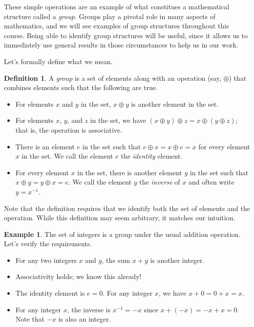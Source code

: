 \documentclass{book}
\theoremstyle{plain}
\theoremstyle{definition}
\newtheorem{definition}[theorem]{Definition}
\newtheorem{example}[theorem]{Example}
\begin{document}
These simple operations are an example of what constitues a mathematical structure called a {\it group}. Groups play a pivotal role in many aspects of mathematics, and we will see examples of group structures throughout this course. Being able to identify group structures will be useful, since it allows us to immediately use general results in those circumstances to help us in our work.

Let's formally define what we mean.

\begin{definition}
A {\it group} is a set of elements along with an operation (say, $\oplus$) that combines elements such that the following are true.
\begin{itemize}
\item For elements $x$ and $y$ in the set, $x \oplus y$ is another element in the set.
\item For elements $x$, $y$, and $z$ in the set, we have $(x \oplus y) \oplus z = x \oplus (y \oplus z)$; that is, the operation is associative.
\item There is an element $e$ in the set such that $e \oplus x = x \oplus e = x$ for every element $x$ in the set. We call the element $e$ the {\it identity} element.
\item For every element $x$ in the set, there is another element $y$ in the set such that $x \oplus y = y \oplus x = e$. We call the element $y$ the {\it inverse} of $x$ and often write $y = x^{-1}$.
\end{itemize}
\end{definition}

Note that the definition requires that we identify both the set of elements and the operation. While this definition may seem arbitrary, it matches our intuition.

\begin{example}
The set of integers is a group under the usual addition operation. Let's verify the requirements.
\begin{itemize}
\item For any two integers $x$ and $y$, the sum $x+y$ is another integer.
\item Associativity holds; we know this already!
\item The identity element is $e = 0$. For any integer $x$, we have $x + 0 = 0 + x = x$.
\item For any integer $x$, the inverse is $x^{-1} = -x$ since $x + (-x) = -x + x = 0$. Note that $-x$ is also an integer.
\end{itemize}
\end{example}
\end{document}
